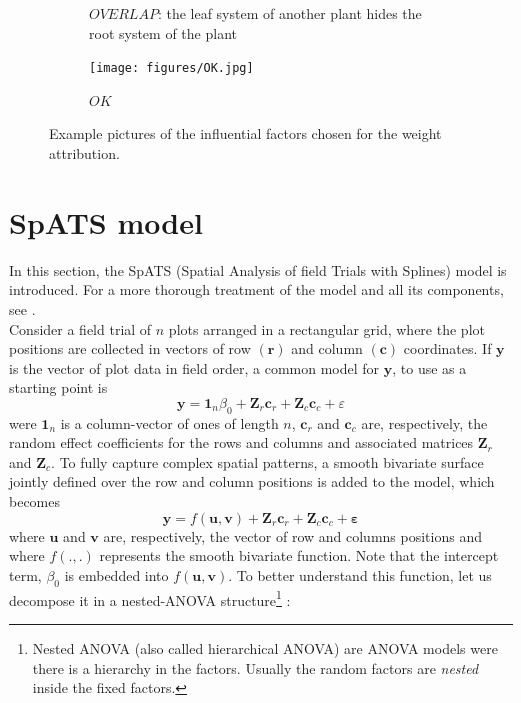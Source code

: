 \begin{figure}
\begin{subfigure}[t]{.13\textwidth}
  \caption{$OVERLAP$: the leaf system of another plant hides the root system of the plant}
  \label{fig:OVERLAP}
\end{subfigure}
%
\begin{subfigure}[t]{.13\textwidth}
  \centering
  \texttt{[image: figures/OK.jpg]}
  \caption{$OK$%
  			}
  \label{fig:OK}
\end{subfigure}
%
\caption{Example pictures of the influential factors chosen for the weight attribution.}
\label{fig:example_influential_factors}
\end{figure}
%

\section{SpATS model}
\label{sec:spats_model}
In this section, the SpATS (Spatial Analysis of field Trials with Splines) model is introduced. For a more thorough treatment of the model and all its components, see \textcite{rodriguez-alvarez_spatial_2016}.\\
Consider a field trial of $n$ plots arranged in a rectangular grid, where the plot positions are collected in vectors of row $(\mathbf{r})$ and column $(\mathbf{c})$ coordinates. If $\mathbf{y}$ is the vector of plot data in field order, a common model for $\mathbf{y}$, to use as a starting point is
	\begin{equation}
	    \boldsymbol{y}=\mathbf{1}_{n} \beta_{0}+\boldsymbol{Z}_{r} \boldsymbol{c}_{r}+\boldsymbol{Z}_{c} \boldsymbol{c}_{c}
	    +\varepsilon
	\end{equation}
were $\mathbf{1}_{n}$ is a column-vector of ones of length $n$, $\boldsymbol{c}_{r}$ and $\boldsymbol{c}_{c}$ are, respectively, the random effect coefficients for the rows and columns and associated matrices $\boldsymbol{Z}_{r}$ and $\boldsymbol{Z}_{c}$. To fully capture complex spatial patterns, a smooth bivariate surface jointly defined over the row and column positions is added to the model, which becomes
	\begin{equation}
	    \boldsymbol{y}=f(\boldsymbol{u}, \boldsymbol{v})+\boldsymbol{Z}_{r} \boldsymbol{c}_{r}+\boldsymbol{Z}_{c} \boldsymbol{c}
	    _{c}+\boldsymbol{\varepsilon}
	    \label{eq:base_model_bismooth_surface}
	\end{equation}
where $\boldsymbol{u}$ and $\boldsymbol{v}$ are, respectively, the vector of row and columns positions and where $f(.,.)$ represents the smooth bivariate function. Note that the intercept term, $\beta_0$ is embedded into $f(\boldsymbol{u}, \boldsymbol{v})$. To better understand this function, let us decompose it in a nested-ANOVA structure\footnote{Nested ANOVA (also called hierarchical ANOVA) are ANOVA models were there is a hierarchy in the factors. Usually the random factors are \textit{nested} inside the fixed factors.} \parencite{lee_efficient_2013}:
